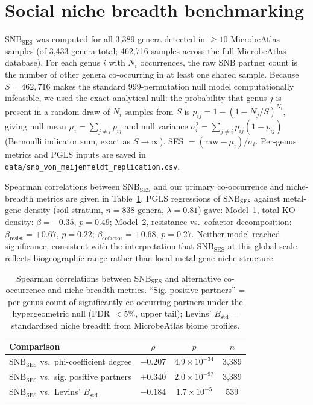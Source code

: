 \documentclass[11pt]{article}
\begin{document}
\section{Social niche breadth benchmarking}
\label{sec:snb_benchmark}

$\text{SNB}_\text{SES}$ was computed for all 3{,}389 genera detected in
$\ge 10$ MicrobeAtlas samples (of 3{,}433 genera total; 462{,}716 samples
across the full MicrobeAtlas database). For each genus $i$ with $N_i$ occurrences, the
raw SNB partner count is the number of other genera co-occurring in at least
one shared sample. Because $S = 462{,}716$ makes the standard
999-permutation null model computationally infeasible, we used the exact
analytical null: the probability that genus $j$ is present in a random draw
of $N_i$ samples from $S$ is $p_{ij} = 1 - (1 - N_j/S)^{N_i}$, giving
null mean $\mu_i = \sum_{j \ne i} p_{ij}$ and null variance
$\sigma^2_i = \sum_{j \ne i} p_{ij}(1-p_{ij})$ (Bernoulli indicator sum,
exact as $S \to \infty$). SES $= (\text{raw} - \mu_i)/\sigma_i$.
Per-genus metrics and PGLS inputs are saved in
\texttt{data/snb\_von\_meijenfeldt\_replication.csv}.

Spearman correlations between $\text{SNB}_\text{SES}$ and our primary
co-occurrence and niche-breadth metrics are given in
Table~\ref{tab:snb_correlations}. PGLS regressions of $\text{SNB}_\text{SES}$
against metal-gene density (soil stratum, $n = 838$ genera, $\lambda = 0.81$)
gave: Model~1, total KO density: $\beta = -0.35$, $p = 0.49$; Model~2,
resistance vs.\ cofactor decomposition: $\beta_\text{resist} = +0.67$,
$p = 0.22$; $\beta_\text{cofactor} = +0.68$, $p = 0.27$. Neither model
reached significance, consistent with the interpretation that
$\text{SNB}_\text{SES}$ at this global scale reflects biogeographic range
rather than local metal-gene niche structure.

\begin{table}[htbp]
\centering
\caption{Spearman correlations between $\text{SNB}_\text{SES}$ and alternative
co-occurrence and niche-breadth metrics. ``Sig. positive partners'' =
per-genus count of significantly co-occurring partners under the hypergeometric
null (FDR $< 5\%$, upper tail); Levins' $B_\text{std}$ = standardised niche
breadth from MicrobeAtlas biome profiles.}
\label{tab:snb_correlations}
\begin{tabular}{lccc}
\toprule
Comparison & $\rho$ & $p$ & $n$ \\
\midrule
$\text{SNB}_\text{SES}$ vs.\ phi-coefficient degree & $-0.207$ & $4.9 \times 10^{-34}$ & 3{,}389 \\
$\text{SNB}_\text{SES}$ vs.\ sig. positive partners & $+0.340$ & $2.0 \times 10^{-92}$ & 3{,}389 \\
$\text{SNB}_\text{SES}$ vs.\ Levins' $B_\text{std}$ & $-0.184$ & $1.7 \times 10^{-5}$  & 539 \\
\bottomrule
\end{tabular}
\end{table}
\end{document}
